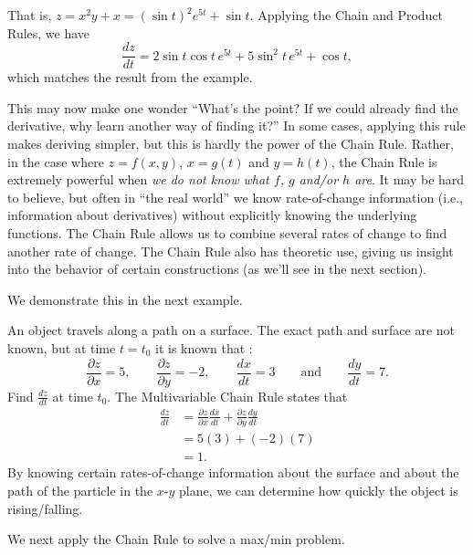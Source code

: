 That is, $z = x^2y+x = (\sin t)^2e^{5t}+\sin t.$ Applying the Chain and Product Rules, we have 
\[\frac{dz}{dt} = 2\sin t\cos t\, e^{5t}+ 5\sin^2t\,e^{5t}+\cos t,\]
which matches the result from the example.

This may now make one wonder ``What's the point? If we could already find the derivative, why learn another way of finding it?'' In some cases, applying this rule makes deriving simpler, but this is hardly the power of the Chain Rule. Rather, in the case where $z=f(x,y)$, $x=g(t)$ and $y=h(t)$, the Chain Rule is extremely powerful when \textit{we do not know what $f$, $g$ and/or $h$ are}. It may be hard to believe, but often in ``the real world'' we know rate-of-change information (i.e., information about derivatives) without explicitly knowing the underlying functions. The Chain Rule allows us to combine several rates of change to find another rate of change. The Chain Rule also has theoretic use, giving us insight into the behavior of certain constructions (as we'll see in the next section).

We demonstrate this in the next example.

\begin{example}\label{ex_mchain100}
An object travels along a path on a surface. The exact path and surface are not known, but at time $t=t_0$ it is known that :
\[\frac{\partial z}{\partial x} = 5,\qquad \frac{\partial z}{\partial y}=-2,\qquad \frac{dx}{dt}=3\qquad \text{and}\qquad \frac{dy}{dt}=7.\]
Find $\frac{dz}{dt}$ at time $t_0$.
\solution
The Multivariable Chain Rule states that 
\begin{align*}
\frac{dz}{dt} &= \frac{\partial z}{\partial x}\frac{dx}{dt} + \frac{\partial z}{\partial y}\frac{dy}{dt} \\
				&= 5(3)+(-2)(7) \\
				&=1.
\end{align*}
By knowing certain rates-of-change information about the surface and about the path of the particle in the $x$-$y$ plane, we can determine how quickly the object is rising/falling.
\end{example}

We next apply the Chain Rule to solve a max/min problem.

